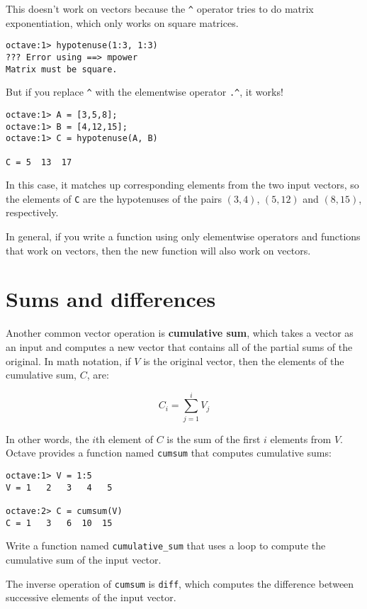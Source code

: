 This doesn't work on vectors because the \verb+^+ operator
tries to do matrix exponentiation, which only works on
square matrices.

\begin{verbatim}
octave:1> hypotenuse(1:3, 1:3)
??? Error using ==> mpower
Matrix must be square.
\end{verbatim}

But if you replace \verb+^+ with the elementwise operator
\verb+.^+, it works!

\begin{verbatim}
octave:1> A = [3,5,8];
octave:1> B = [4,12,15];
octave:1> C = hypotenuse(A, B)

C = 5  13  17
\end{verbatim}
 
In this case, it matches up corresponding elements from the two
input vectors, so the elements of {\tt C} are the hypotenuses of
the pairs $(3,4)$, $(5,12)$ and $(8,15)$, respectively.

In general, if you write a function using only elementwise
operators and functions that work on vectors, then the new
function will also work on vectors.


\section{Sums and differences}

Another common vector operation is {\bf cumulative sum}, which takes a
vector as an input and computes a new vector that contains all of the
partial sums of the original. In math notation, if $V$ is the
original vector, then the elements of the cumulative sum, $C$, are:

\[ C_i = \sum_{j=1}^i V_j \]

In other words, the $i$th element of $C$ is the sum of the first
$i$ elements from $V$. Octave provides a function named {\tt cumsum}
that computes cumulative sums:

\begin{verbatim}
octave:1> V = 1:5
V = 1   2   3   4   5

octave:2> C = cumsum(V)
C = 1   3   6  10  15
\end{verbatim}

\begin{ex}
Write a function named {\tt cumulative\_sum} that uses
a loop to compute the cumulative sum of the input vector.
\end{ex}

The inverse operation of {\tt cumsum} is {\tt diff}, which computes
the difference between successive elements of the input vector.

